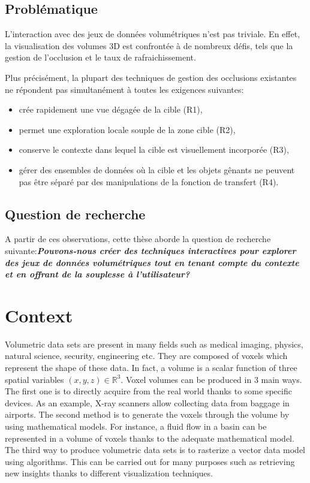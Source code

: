 \subsection{Problématique}
L'interaction avec des jeux de données volumétriques n'est pas triviale. En effet, la visualisation des volumes 3D est confrontée à de nombreux défis, tels que la gestion de l'occlusion et le taux de rafraichissement.


Plus précisément, la plupart des techniques de gestion des occlusions existantes ne répondent pas simultanément à toutes les exigences suivantes:
\begin{itemize}
\item crée rapidement une vue dégagée de la cible (R1),
\item permet une exploration locale souple de la zone cible (R2),
\item conserve le contexte dans lequel la cible est visuellement incorporée (R3),
\item gérer des ensembles de données où la cible et les objets gênants ne peuvent pas être séparé par des manipulations de la fonction de transfert (R4).
\end{itemize}

\subsection{ Question de recherche }

A partir de ces observations, cette thèse aborde la question de recherche suivante:\textbf{\textit{Pouvons-nous créer des techniques interactives pour explorer des jeux de données volumétriques tout en tenant compte du contexte et en offrant de la souplesse à l'utilisateur? }}
\NewPage


\section{Context}

Volumetric data sets are present in many fields such as medical imaging, physics, natural science, security, engineering etc. They are composed of voxels which represent the shape of these data. In fact, a volume is a scalar function of three spatial variables $(x,y,z) \in \mathbb{R}^3$. Voxel volumes can be produced in 3 main ways. The first one is to directly acquire from the real world thanks to some specific devices. As an example, X-ray scanners allow collecting data from baggage in airports. The second method is to generate the voxels through the volume by using mathematical models. For instance, a fluid flow in a basin can be represented in a volume of voxels thanks to the adequate mathematical model. The third way to produce volumetric data sets is to rasterize a vector data model using algorithms. This can be carried out for many purposes such as retrieving new insights thanks to different visualization techniques.


